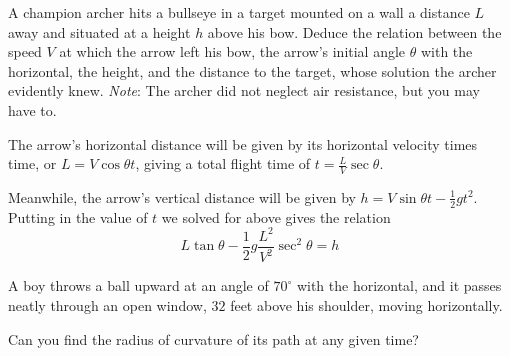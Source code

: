 \documentclass[../feynman-lectures-on-physics.tex]{subfiles}
\begin{document}
\begin{questions}
	\question A champion archer hits a bullseye in a target mounted on a wall a distance $L$ away and situated at a height $h$ above his bow. Deduce the relation between the speed $V$ at which the arrow left his bow, the arrow's initial angle $\theta$ with the horizontal, the height, and the distance to the target, whose solution the archer evidently knew.
	\textit{Note}: The archer did not neglect air resistance, but you may have to.

  \begin{solution}
    The arrow's horizontal distance will be given by its horizontal velocity
    times time, or $L = V\cos\theta{t}$, giving a total flight time of $t = \frac{L}{V}\sec\theta$.

    Meanwhile, the arrow's vertical distance will be given by $h =
    V\sin\theta{t} - \frac{1}{2}gt^2$. Putting in the value of $t$ we solved for
    above gives the relation
    \[
      L\tan\theta - \frac{1}{2}g\frac{L^2}{V^2}\sec^2\theta = h
    \]
  \end{solution}

	\question A boy throws a ball upward at an angle of $70^\circ$ with the horizontal, and it passes neatly through an open window, $32$ feet above his shoulder, moving horizontally.
	Can you find the radius of curvature of its path at any given time?

  \begin{solution}
\end{solution}
\end{questions}
\end{document}
